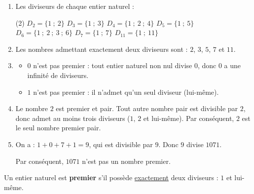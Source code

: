 \documentclass[10pt, a4paper]{article}
\begin{document}
\begin{Solution}[ACTIVITÉ][2]

\begin{enumerate}[leftmargin=*,itemsep=0.5pt]
    \item Les diviseurs de chaque entier naturel :
\begin{tasks}[label=$\bullet$, label-width=12pt, item-indent=15pt](2)
    \task $D_2 = \big\{1 ~;~ 2\big\}$
    \task $D_3 = \big\{1 ~;~ 3\big\}$
    \task $D_4 = \big\{1 ~;~ 2 ~;~ 4\big\}$
    \task $D_5 = \big\{1 ~;~ 5\big\}$
    \task $D_6 = \big\{1 ~;~ 2 ~;~  3 ~;~ 6\big\}$
    \task $D_7 = \big\{1 ~;~ 7\big\}$
    \task $D_{11} = \big\{1 ~;~ 11\big\}$
\end{tasks}


    \item Les nombres admettant exactement deux diviseurs sont : $2$, $3$, $5$, $7$ et $11$.
    
    \item \begin{itemize}[leftmargin=*,itemsep=0.5pt]
    \item $0$ n'est pas premier : tout entier naturel non nul divise $0$, donc $0$ a une infinité de diviseurs.
    \item $1$ n'est pas premier : il n'admet qu'un seul diviseur (lui-même).
\end{itemize}
    
    \item Le nombre $2$ est premier et pair. Tout autre nombre pair est divisible par $2$, donc admet au moins trois diviseurs ($1$, $2$ et lui-même). Par conséquent, $2$ est le seul nombre premier pair.
    
    \item On a : $1 + 0 + 7 + 1 = 9$, qui est divisible par $9$. Donc $9$ divise $1071$.

Par conséquent, $1071$ n'est pas un nombre premier.
\end{enumerate}

\end{Solution}

\begin{Definition}[]
Un entier naturel est \textbf{premier} s'il possède \underline{exactement} deux diviseurs : $1$ et lui-même.
\end{Definition}

\end{document}
